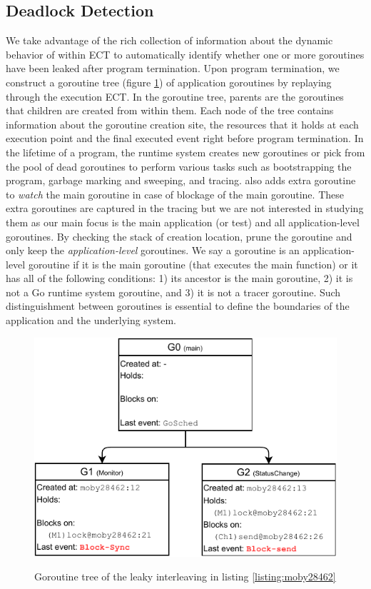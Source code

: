 \subsection{Deadlock Detection}
\label{sec:dld}
We take advantage of the rich collection of information about the dynamic behavior of within ECT to automatically identify whether one or more goroutines have been leaked after program termination.
%
Upon program termination, we construct a goroutine tree (figure \ref{fig:gtree}) of application goroutines by replaying through the execution ECT.
%
In the goroutine tree, parents are the goroutines that children are created from within them. Each node of the tree contains information about the goroutine creation site, the resources that it holds at each execution point and the final executed event right before program termination.
%
In the lifetime of a program, the runtime system creates new goroutines or pick from the pool of dead goroutines to perform various tasks such as bootstrapping the program, garbage marking and sweeping, and tracing.
%
\goat also adds extra goroutine to \textit{watch} the main goroutine in case of blockage of the main goroutine.
%
These extra goroutines are captured in the tracing but we are not interested in studying them as our main focus is the main application (or test) and all application-level goroutines.
%
By checking the stack of creation location, \goat prune the goroutine and only keep the \textit{application-level} goroutines.
%
We say a goroutine is an application-level goroutine if it is the main goroutine (that executes the main function) or it has all of the following conditions:
1) its ancestor is the main goroutine,
2) it is not a Go runtime system goroutine, and
3) it is not a tracer goroutine.
Such distinguishment between goroutines is essential to define the boundaries of the application and the underlying system.



\begin{figure}[]
\centering
\includegraphics[width=0.75\linewidth]{figs/gtree.pdf}
\label{fig:gtree}
\caption{Goroutine tree of the leaky interleaving in listing \ref{listing:moby28462}}
\end{figure}

